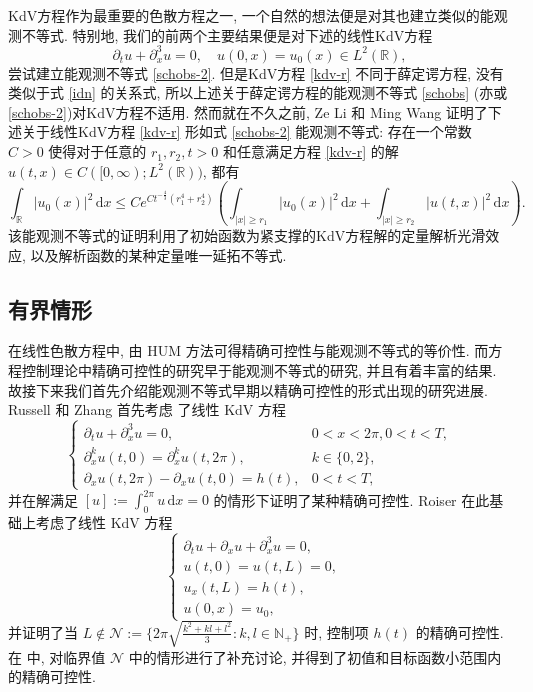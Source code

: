 \documentclass[master]{cugthesis}
\newcommand\N{\ensuremath{\mathbb{N}}}
\newcommand\R{\ensuremath{\mathbb{R}}}
\renewcommand\d{\ensuremath{\,\mathrm{d}}}
\begin{document}
    KdV方程作为最重要的色散方程之一,  一个自然的想法便是对其也建立类似的能观测不等式. 特别地, 我们的前两个主要结果便是对下述的线性KdV方程
    \begin{equation*}
        \partial_t u+\partial_x^3 u=0,\quad u(0,x)=u_0(x)\in L^2(\R),
    \end{equation*} 
    尝试建立能观测不等式 \eqref{schobs-2}. 但是KdV方程 \eqref{kdv-r} 不同于薛定谔方程, 没有类似于式 \eqref{idn} 的关系式, 所以上述关于薛定谔方程的能观测不等式 \eqref{schobs} (亦或 \eqref{schobs-2})对KdV方程不适用. 然而就在不久之前, Ze Li 和 Ming Wang 证明了下述关于线性KdV方程 \eqref{kdv-r} 形如式 \eqref{schobs-2} 能观测不等式: 存在一个常数 $C>0$ 使得对于任意的 $r_1,r_2,t>0$ 和任意满足方程 \eqref{kdv-r} 的解 $u(t,x)\in C([0,\infty);L^2(\R))$, 都有
    \begin{equation}
        \int_{\R}|u_0(x)|^2\d x\le Ce^{Ct^{-\frac{4}{3}}\left(r_1^4+r_2^4\right)}\left(\int
        _{|x|\ge r_1}|u_0(x)|^2\d x+\int _{|x|\ge r_2}|u(t,x)|^2\d x\right).\label{kdvobs-1}
    \end{equation}
    该能观测不等式的证明利用了初始函数为紧支撑的KdV方程解的定量解析光滑效应, 以及解析函数的某种定量唯一延拓不等式. 
   
   \subsection{有界情形}
   在线性色散方程中, 由 HUM 方法可得精确可控性与能观测不等式的等价性. 而方程控制理论中精确可控性的研究早于能观测不等式的研究, 并且有着丰富的结果. 故接下来我们首先介绍能观测不等式早期以精确可控性的形式出现的研究进展. Russell 和 Zhang 首先考虑    \cite{russell1993controllability} 了线性 KdV 方程
   \begin{equation}
       \left\lbrace\begin{array}{ll}
           \partial_t u+\partial_{x}^3u=0, & 0<x<2\pi,0<t<T, \\
           \partial_x^k u(t,0)=\partial_x^ku(t,2\pi), & k\in \lbrace0,2\rbrace,\\
           \partial_x u(t,2\pi)-\partial_x u(t,0)=h(t), & 0<t<T,
       \end{array}\right.
   \end{equation}
   并在解满足 $[u]:=\int_0^{2\pi}u\d x=0$ 的情形下证明了某种精确可控性. Roiser \cite{rosier1997exact}在此基础上考虑了线性 KdV 方程
   \begin{equation}
       \left\lbrace
       \begin{array}{ll}
           \partial_t u+\partial_x u+\partial_x^3 u=0, &  \\
           u(t,0)=u(t,L)=0, & \\
           u_x(t,L)=h(t),&\\
           u(0,x)=u_0,
       \end{array}
       \right.
   \end{equation}
   并证明了当 $L\notin \mathcal{N}:=\lbrace 2\pi \sqrt{\frac{k^2+kl+l^2}{3}}: k,l\in \N_+\rbrace$ 时, 控制项 $h(t)$ 的精确可控性.  在 \cite{coron2004exact} 中, 对临界值 $\mathcal{N}$ 中的情形进行了补充讨论, 并得到了初值和目标函数小范围内的精确可控性. 
   
\end{document}
